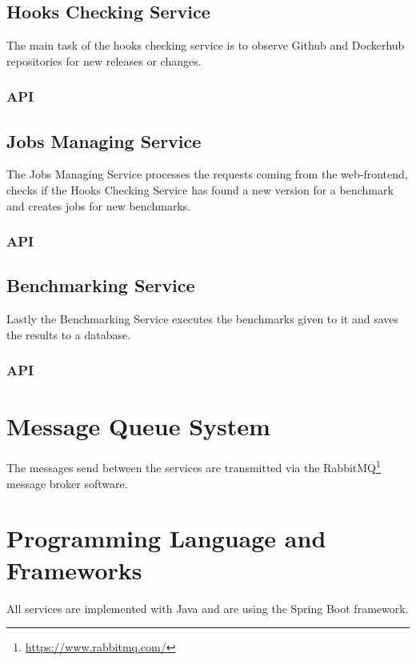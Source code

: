 \subsection{Hooks Checking Service}
\label{sec:hooks_checking_service}
The main task of the hooks checking service is to observe Github and Dockerhub repositories for new releases or changes.

\subsubsection{API}
\label{sec:hooks_api}


\subsection{Jobs Managing Service}
\label{sec:jobs_managing_service}
The Jobs Managing Service processes the requests coming from the web-frontend, checks if the Hooks Checking Service has found a new version for a benchmark and creates jobs for new benchmarks.

\subsubsection{API}
\label{sec:jobs_api}


\subsection{\ts{} Benchmarking Service}
\label{sec:ts_benchmarking_service}
Lastly the \ts{} Benchmarking Service executes the benchmarks given to it and saves the results to a database.

\subsubsection{API}
\label{sec:benchmarking_api}


\section{Message Queue System}
\label{sec:message_queue}
The messages send between the services are transmitted via the RabbitMQ\footnote{\url{https://www.rabbitmq.com/}} message broker software.


\section{Programming Language and Frameworks}
\label{sec:prog_lang_and_framework}
All services are implemented with Java and are using the Spring Boot framework.

